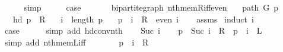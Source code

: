 \begin{isabellebody}
\ \ \ \ \isamarkupfalse%
\ simp\isanewline
\ \ \isamarkupfalse%
\ \isamarkupfalse%
\ {\isacharquery}{\kern0pt}case\isanewline
\ \ \ \ \isacommand{{\isachardot}{\kern0pt}}\isamarkupfalse%
\isanewline
{}\isamarkupfalse%
%
\endisatagproof
{\isafoldproof}%
%
\isadelimproof
\isanewline
%
\endisadelimproof
\isanewline
{}\isamarkupfalse%
\ {\isacharparenleft}{\kern0pt}\ bipartite{\isacharunderscore}{\kern0pt}graph{\isacharparenright}{\kern0pt}\ nth{\isacharunderscore}{\kern0pt}mem{\isacharunderscore}{\kern0pt}R{\isacharunderscore}{\kern0pt}iff{\isacharunderscore}{\kern0pt}even{\isacharcolon}{\kern0pt}\isanewline
\ \ \ {\isachardoublequoteopen}path\ G\ p{\isachardoublequoteclose}\isanewline
\ \ \ {\isachardoublequoteopen}hd\ p\ {\isasymin}\ R{\isachardoublequoteclose}\isanewline
\ \ \ {\isachardoublequoteopen}i\ {\isacharless}{\kern0pt}\ length\ p{\isachardoublequoteclose}\isanewline
\ \ \ {\isachardoublequoteopen}p\ {\isacharbang}{\kern0pt}\ i\ {\isasymin}\ R\ {\isasymlongleftrightarrow}\ even\ i{\isachardoublequoteclose}\isanewline
%
\isadelimproof
\ \ %
\endisadelimproof
%
\isatagproof
{}\isamarkupfalse%
\ assms\isanewline
{}\isamarkupfalse%
\ {\isacharparenleft}{\kern0pt}induct\ i{\isacharparenright}{\kern0pt}\isanewline
\ \ \isamarkupfalse%
\ {}\isanewline
\ \ \isamarkupfalse%
\ {\isacharquery}{\kern0pt}case\isanewline
\ \ \ \ \isamarkupfalse%
\ {\isacharparenleft}{\kern0pt}simp\ add{\isacharcolon}{\kern0pt}\ hd{\isacharunderscore}{\kern0pt}conv{\isacharunderscore}{\kern0pt}nth{\isacharparenright}{\kern0pt}\isanewline
{}\isamarkupfalse%
\isanewline
\ \ \isamarkupfalse%
\ {\isacharparenleft}{\kern0pt}Suc\ i{\isacharparenright}{\kern0pt}\isanewline
\ \ \isamarkupfalse%
\ {\isachardoublequoteopen}p\ {\isacharbang}{\kern0pt}\ Suc\ i\ {\isasymin}\ R\ {\isasymlongleftrightarrow}\ p\ {\isacharbang}{\kern0pt}\ i\ {\isasymin}\ L{\isachardoublequoteclose}\isanewline
\ \ \ \ \isamarkupfalse%
\ {\isacharparenleft}{\kern0pt}simp\ add{\isacharcolon}{\kern0pt}\ nth{\isacharunderscore}{\kern0pt}mem{\isacharunderscore}{\kern0pt}L{\isacharunderscore}{\kern0pt}iff{\isacharparenright}{\kern0pt}\isanewline
\ \ \isamarkupfalse%
\ \isamarkupfalse%
\ {\isachardoublequoteopen}{\isachardot}{\kern0pt}{\isachardot}{\kern0pt}{\isachardot}{\kern0pt}\ {\isasymlongleftrightarrow}\ p\ {\isacharbang}{\kern0pt}\ i\ {\isasymnotin}\ R{\isachardoublequoteclose}\isanewline

\end{isabellebody}
